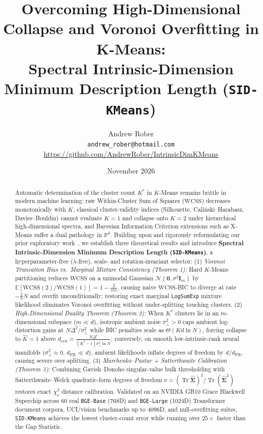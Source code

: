 \documentclass[11pt]{article}
\title{\textbf{Overcoming High-Dimensional Collapse and Voronoi Overfitting in K-Means:\\
Spectral Intrinsic-Dimension Minimum Description Length (\texttt{SID-KMeans})}}
\author{Andrew Rober\\
\small \texttt{andrew\_rober@hotmail.com} \quad \url{https://github.com/AndrewRober/IntrinsicDimKMeans}}
\date{November 2026}
\begin{document}
\maketitle

\begin{abstract}
Automatic determination of the cluster count $K^*$ in $K$-Means remains brittle in modern machine learning: raw Within-Cluster Sum of Squares ($\mathrm{WCSS}$) decreases monotonically with $K$, classical cluster-validity indices (Silhouette, Cali\'nski--Harabasz, Davies--Bouldin) cannot evaluate $K=1$ and collapse onto $K=2$ under hierarchical high-dimensional spectra, and Bayesian Information Criterion extensions such as X-Means suffer a dual pathology in $\mathbb{R}^d$. Building upon and rigorously reformulating our prior exploratory work~\cite{rober2023kmeans}, we establish three theoretical results and introduce \textbf{Spectral Intrinsic-Dimension Minimum Description Length (\texttt{SID-KMeans})}, a hyperparameter-free ($\lambda$-free), scale- and rotation-invariant selector:
(1) \emph{Voronoi Truncation Bias vs.\ Marginal Mixture Consistency (Theorem 1):} Hard $K$-Means partitioning reduces $\mathrm{WCSS}$ on a unimodal Gaussian $\mathcal{N}(\mathbf{0}, \sigma^2\mathbf{I}_m)$ by $\mathbb{E}[\mathrm{WCSS}(2)/\mathrm{WCSS}(1)] = 1 - \frac{2}{\pi m}$, causing naive $\mathrm{WCSS}$-BIC to diverge at rate $-\frac{2}{\pi}N$ and overfit unconditionally; restoring exact marginal \texttt{LogSumExp} mixture likelihood eliminates Voronoi overfitting without under-splitting touching clusters.
(2) \emph{High-Dimensional Duality Theorem (Theorem 2):} When $K^*$ clusters lie in an $m$-dimensional subspace ($m \ll d$), isotropic ambient noise $\sigma_\perp^2 > 0$ caps ambient log-distortion gains at $N\Delta^2/\sigma_\perp^2$ while BIC penalties scale as $\Theta(Kd\ln N)$, forcing collapse to $\hat{K}=1$ above $d_{\mathrm{crit}} = \frac{N\Delta^2}{(K^*-1)\sigma_\perp^2\ln N}$; conversely, on smooth low-intrinsic-rank neural manifolds ($\sigma_\perp^2 \approx 0$, $d_{\mathrm{PR}} \ll d$), ambient likelihoods inflate degrees of freedom by $d / d_{\mathrm{PR}}$, causing severe over-splitting.
(3) \emph{Marchenko--Pastur + Satterthwaite Calibration (Theorem 3):} Combining Gavish--Donoho singular-value bulk thresholding with Satterthwaite--Welch quadratic-form degrees of freedom $\nu = (\operatorname{Tr}\hat{\bm{\Sigma}})^2 / \operatorname{Tr}(\hat{\bm{\Sigma}}^2)$ restores exact $\chi_\nu^2$ distance calibration. Validated on an NVIDIA GB10 Grace Blackwell Superchip across 60 real \texttt{BGE-Base} (768D) and \texttt{BGE-Large} (1024D) Transformer document corpora, UCI/vision benchmarks up to 4096D, and null-overfitting suites, \texttt{SID-KMeans} achieves the lowest cluster-count error while running over $25\times$ faster than the Gap Statistic.
\end{abstract}
\end{document}
